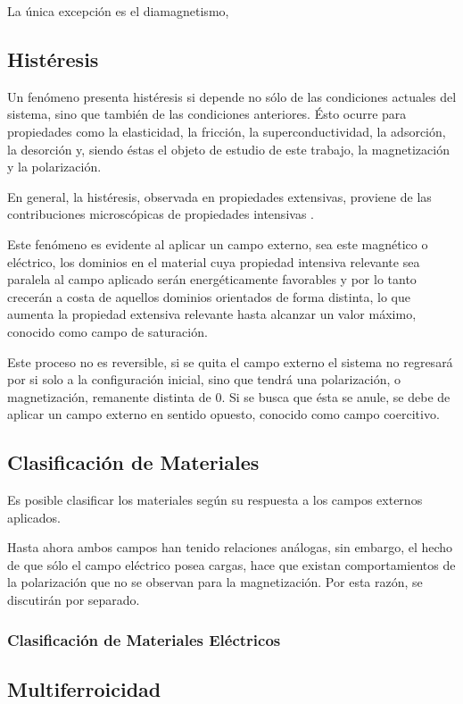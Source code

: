\documentclass[../main.tex]{subfiles}
\begin{document}
La única excepción es el diamagnetismo, 
\subsection{Histéresis} \label{sec:hist}
Un fenómeno presenta histéresis si depende no sólo de las condiciones actuales del sistema, sino que también de las condiciones anteriores. Ésto ocurre para propiedades como la elasticidad, la fricción, la superconductividad, la adsorción, la desorción y, siendo éstas el objeto de estudio de este trabajo, la magnetización y la polarización.

En general, la histéresis, observada en propiedades extensivas, proviene de las contribuciones microscópicas de propiedades intensivas \cite{Visintin2006}.

Este fenómeno es evidente al aplicar un campo externo, sea este magnético o eléctrico, los dominios en el material cuya propiedad intensiva relevante sea paralela al campo aplicado serán energéticamente favorables y por lo tanto crecerán a costa de aquellos dominios orientados de forma distinta, lo que aumenta la propiedad extensiva relevante hasta alcanzar un valor máximo, conocido como campo de saturación.

Este proceso no es reversible, si se quita el campo externo el sistema no regresará por si solo a la configuración inicial, sino que tendrá una polarización, o magnetización, remanente distinta de 0. Si se busca que ésta se anule, se debe de aplicar un campo externo en sentido opuesto, conocido como campo coercitivo.
\subsection{Clasificación de Materiales}
Es posible clasificar los materiales según su respuesta a los campos externos aplicados.

Hasta ahora ambos campos han tenido relaciones análogas, sin embargo, el hecho de que sólo el campo eléctrico posea cargas, hace que existan comportamientos de la polarización que no se observan para la magnetización. Por esta razón, se discutirán por separado.

\subsubsection{Clasificación de Materiales Eléctricos}
\subsection{Multiferroicidad}
\end{document}
